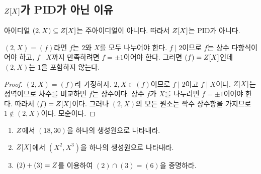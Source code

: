 \subsection{\texorpdfstring{$Z[X]$}{Z[X]}가 PID가 아닌 이유}

\begin{proposition}
아이디얼 $(2,X)\subseteq Z[X]$는 주아이디얼이 아니다. 따라서 $Z[X]$는 PID가 아니다.
\end{proposition}

\begin{proofidea}
$(2,X)=(f)$라면 $f$는 $2$와 $X$를 모두 나누어야 한다. $f\mid2$이므로 $f$는 상수 다항식이어야 하고, $f\mid X$까지 만족하려면 $f=\pm1$이어야 한다. 그러면 $(f)=Z[X]$인데 $(2,X)$는 $1$을 포함하지 않는다.
\end{proofidea}

\begin{proof}
$(2,X)=(f)$라 가정하자. $2,X\in(f)$이므로 $f\mid2$이고 $f\mid X$이다. $Z[X]$는 정역이므로 차수를 비교하면 $f$는 상수이다. 상수 $f$가 $X$를 나누려면 $f=\pm1$이어야 한다. 따라서 $(f)=Z[X]$이다. 그러나 $(2,X)$의 모든 원소는 짝수 상수항을 가지므로 $1\notin(2,X)$이다. 모순이다.
\end{proof}

\begin{checkpoint}
\begin{enumerate}[label=(\alph*)]
  \item $Z$에서 $(18,30)$을 하나의 생성원으로 나타내라.
  \item $Z[X]$에서 $(X^2,X^3)$을 하나의 생성원으로 나타내라.
  \item $(2)+(3)=Z$를 이용하여 $(2)\cap(3)=(6)$을 증명하라.
\end{enumerate}
\end{checkpoint}

